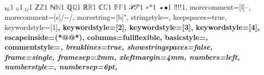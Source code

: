 {    {ₖ}{{\ensuremath{_k}}}1
    {ᵢ}{{\ensuremath{_i}}}1
    {ⱼ}{{\ensuremath{_j}}}1
    {ℤ}{{\ensuremath{\mathbb{Z}}}}1
    {ℕ}{{\ensuremath{\mathbb{N}}}}1
    {ℚ}{{\ensuremath{\mathbb{Q}}}}1
    {ℝ}{{\ensuremath{\mathbb{R}}}}1
    {ℂ}{{\ensuremath{\mathbb{C}}}}1
    {𝔽}{{\ensuremath{\mathbb{F}}}}1
    {𝒫}{{\ensuremath{\mathcal{P}}}}1
    {∗}{{\ensuremath{\ast}}}1
    {•}{{\ensuremath{\bullet}}}1
    {‼}{{!!}}1,
  morecomment=[l]{--},
  morecomment=[s]{/-}{-/},
  morestring=[b]",
  stringstyle=\color{stringcolor},
  keepspaces=true,
  keywordstyle=[1]\color{keywordcolor}\bfseries,
  keywordstyle=[2]\color{sortcolor}\bfseries,
  keywordstyle=[3]\color{tacticcolor}\bfseries,
  keywordstyle=[4]\color{errorcolor}\bfseries\underline,
  escapeinside={(*@}{@*)},
  columns=fullflexible,
  basicstyle=\ttfamily\small,
  commentstyle=\color{commentcolor}\itshape,
  breaklines=true,
  showstringspaces=false,
  frame=single,
  framesep=2mm,
  xleftmargin=4mm,
  numbers=left,
  numberstyle=\tiny\color{commentcolor},
  numbersep=6pt,
}

\newcommand{\lean}[1]{\lstinline[language=lean,basicstyle=\ttfamily\normalsize]|#1|}

